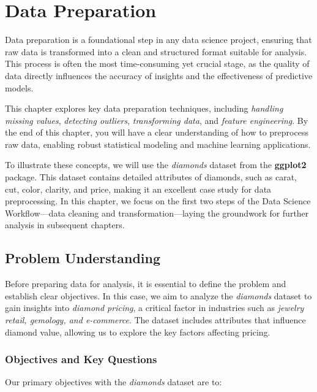 \documentclass[
]{book}
\theoremstyle{definition}
\theoremstyle{definition}
\theoremstyle{definition}
\theoremstyle{definition}
\theoremstyle{remark}
\begin{document}
\chapter{Data Preparation}\label{chapter-data-prep}

Data preparation is a foundational step in any data science project, ensuring that raw data is transformed into a clean and structured format suitable for analysis. This process is often the most time-consuming yet crucial stage, as the quality of data directly influences the accuracy of insights and the effectiveness of predictive models.

This chapter explores key data preparation techniques, including \emph{handling missing values}, \emph{detecting outliers}, \emph{transforming data}, and \emph{feature engineering}. By the end of this chapter, you will have a clear understanding of how to preprocess raw data, enabling robust statistical modeling and machine learning applications.

To illustrate these concepts, we will use the \emph{diamonds} dataset from the \textbf{ggplot2} package. This dataset contains detailed attributes of diamonds, such as carat, cut, color, clarity, and price, making it an excellent case study for data preprocessing. In this chapter, we focus on the first two steps of the Data Science Workflow---data cleaning and transformation---laying the groundwork for further analysis in subsequent chapters.

\section{Problem Understanding}\label{problem-understanding}

Before preparing data for analysis, it is essential to define the problem and establish clear objectives. In this case, we aim to analyze the \emph{diamonds} dataset to gain insights into \emph{diamond pricing}, a critical factor in industries such as \emph{jewelry retail, gemology, and e-commerce}. The dataset includes attributes that influence diamond value, allowing us to explore the key factors affecting pricing.

\subsection*{Objectives and Key Questions}\label{objectives-and-key-questions}

Our primary objectives with the \emph{diamonds} dataset are to:
\end{document}
